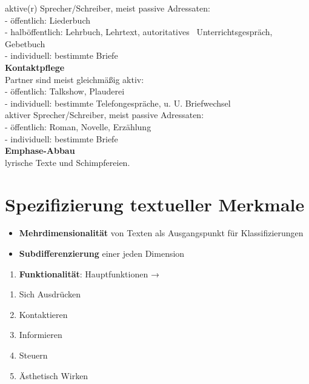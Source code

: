 \documentclass[
  letterpaper,
]{scrbook}
\providecommand{\tightlist}{%
  \setlength{\itemsep}{0pt}\setlength{\parskip}{0pt}}\usepackage{longtable,booktabs,array}
\begin{document}
aktive(r) Sprecher/Schreiber, meist passive Adressaten:\\
- öffentlich: Liederbuch\\
- halböffentlich: Lehrbuch, Lehrtext, autoritatives
~Unterrichtsgespräch, Gebetbuch\\
- individuell: bestimmte Briefe\\

\textbf{Kontaktpflege}\\
Partner sind meist gleichmäßig aktiv:\\
- öffentlich: Talkshow, Plauderei\\
- individuell: bestimmte Telefongespräche, u. U. Briefwechsel\\

aktiver Sprecher/Schreiber, meist passive Adressaten:\\
- öffentlich: Roman, Novelle, Erzählung\\
- individuell: bestimmte Briefe\\

\textbf{Emphase-Abbau}\\
lyrische Texte und Schimpfereien.\\

\hypertarget{spezifizierung-textueller-merkmale}{%
\section{Spezifizierung textueller
Merkmale}\label{spezifizierung-textueller-merkmale}}

\begin{itemize}
\item
  \textbf{Mehrdimensionalität} von Texten als Ausgangspunkt für
  Klassifizierungen
\item
  \textbf{Subdifferenzierung} einer jeden Dimension
\end{itemize}

\begin{enumerate}
\def\labelenumi{\arabic{enumi}.}
\tightlist
\item
  \textbf{Funktionalität}: Hauptfunktionen →\\
\end{enumerate}

\begin{enumerate}
\def\labelenumi{\alph{enumi})}
\tightlist
\item
  Sich Ausdrücken\\
\item
  Kontaktieren\\
\item
  Informieren\\
\item
  Steuern\\
\item
  Ästhetisch Wirken\\
\end{enumerate}
\end{document}
